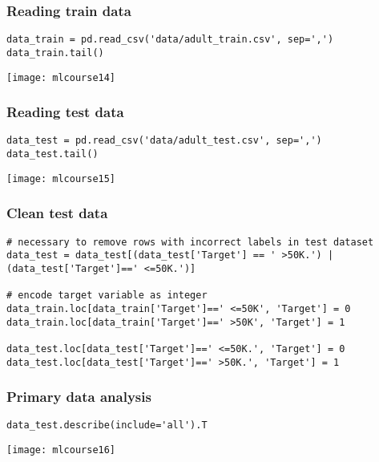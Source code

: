 \begin{frame}[fragile]\frametitle{Reading train data}	
\begin{lstlisting}
data_train = pd.read_csv('data/adult_train.csv', sep=',')
data_train.tail()
\end{lstlisting}
\begin{center}
\texttt{[image: mlcourse14]}
\end{center}
\end{frame}

\begin{frame}[fragile]\frametitle{Reading test data}	
\begin{lstlisting}
data_test = pd.read_csv('data/adult_test.csv', sep=',')
data_test.tail()
\end{lstlisting}
\begin{center}
\texttt{[image: mlcourse15]}
\end{center}
\end{frame}

\begin{frame}[fragile]\frametitle{Clean test data}	
\begin{lstlisting}
# necessary to remove rows with incorrect labels in test dataset
data_test = data_test[(data_test['Target'] == ' >50K.') | (data_test['Target']==' <=50K.')]

# encode target variable as integer
data_train.loc[data_train['Target']==' <=50K', 'Target'] = 0
data_train.loc[data_train['Target']==' >50K', 'Target'] = 1

data_test.loc[data_test['Target']==' <=50K.', 'Target'] = 0
data_test.loc[data_test['Target']==' >50K.', 'Target'] = 1
\end{lstlisting}
\end{frame}

\begin{frame}[fragile]\frametitle{Primary data analysis}	
\begin{lstlisting}
data_test.describe(include='all').T
\end{lstlisting}
\begin{center}
\texttt{[image: mlcourse16]}
\end{center}
\end{frame}

